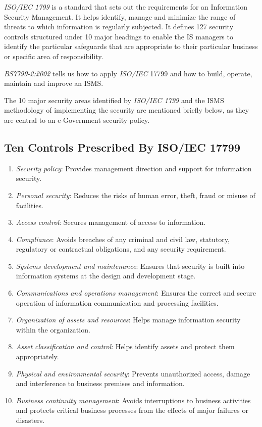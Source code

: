 \textit{ISO/IEC 1799} is a standard that sets out the requirements for an Information Security Management. It helps identify, manage and minimize the range of threats to which information is regularly subjected. It defines 127 security controls structured under 10 major headings to enable the IS managers to identify the particular safeguards that are appropriate to their particular business or specific area of responsibility. 

\textit{BS7799-2:2002} tells us how to apply \textit{ISO/IEC} 17799 and how to build, operate, maintain and improve an ISMS.

The 10 major security areas identified by \textit{ISO/IEC 1799} and the ISMS methodology of implementing the security are mentioned briefly below, as they are central to an e-Government security policy.

\subsection[ISO/IEC 17799]{Ten Controls Prescribed By ISO/IEC 17799}
\begin{enumerate}
	\item \textit{Security policy}: Provides management direction and support for information security.
	
	\item \textit{Personal security}: Reduces the risks of human error, theft, fraud or misuse of facilities.
	
	\item \textit{Access control}: Secures management of access to information.
	
	\item \textit{Compliance}: Avoids breaches of any criminal and civil law, statutory, regulatory or contractual obligations, and any security requirement.
	
	\item \textit{Systems development and maintenance}: Ensures that security is built into information systems at the design and development stage.
	
	\item \textit{Communications and operations management}: Ensures the correct and secure operation of information communication and processing facilities.
	
	\item \textit{Organization of assets and resources}: Helps manage information security within the organization.
	
	\item \textit{Asset classification and control}: Helps identify assets and protect them appropriately.
	
	\item \textit{Physical and environmental security}: Prevents unauthorized access, damage and interference to business premises and information.
	
	\item \textit{Business continuity management}: Avoids interruptions to business activities and protects critical business processes from the effects of major failures or disasters.
\end{enumerate}


